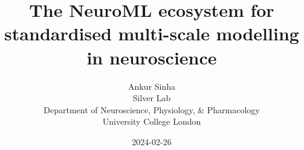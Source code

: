 \renewcommand{\figurename}{}


\renewcommand{\footnoterule}{}
\renewcommand*{\bibfont}{\tiny}

\title{The NeuroML ecosystem for standardised multi-scale modelling in neuroscience}
\author[Ankur Sinha]{Ankur Sinha\\Silver Lab\\Department of Neuroscience, Physiology, \& Pharmacology\\University College London}
\date{2024-02-26}




\begin{frame}
  \titlepage{}
\end{frame}

